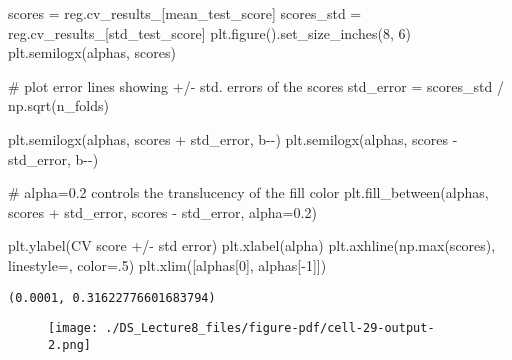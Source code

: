 \documentclass[
  letterpaper,
  DIV=11,
  numbers=noendperiod]{scrreprt}
\newenvironment{Shaded}{\begin{snugshade}}{\end{snugshade}}
\newcommand{\BuiltInTok}[1]{\textcolor[rgb]{0.00,0.23,0.31}{#1}}
\newcommand{\CommentTok}[1]{\textcolor[rgb]{0.37,0.37,0.37}{#1}}
\newcommand{\DecValTok}[1]{\textcolor[rgb]{0.68,0.00,0.00}{#1}}
\newcommand{\FloatTok}[1]{\textcolor[rgb]{0.68,0.00,0.00}{#1}}
\newcommand{\NormalTok}[1]{\textcolor[rgb]{0.00,0.23,0.31}{#1}}
\newcommand{\OperatorTok}[1]{\textcolor[rgb]{0.37,0.37,0.37}{#1}}
\newcommand{\StringTok}[1]{\textcolor[rgb]{0.13,0.47,0.30}{#1}}
\begin{document}
\begin{Shaded}
\begin{Highlighting}[]
\NormalTok{scores }\OperatorTok{=}\NormalTok{ reg.cv\_results\_[}\StringTok{\textquotesingle{}mean\_test\_score\textquotesingle{}}\NormalTok{]}
\NormalTok{scores\_std }\OperatorTok{=}\NormalTok{ reg.cv\_results\_[}\StringTok{\textquotesingle{}std\_test\_score\textquotesingle{}}\NormalTok{]}
\NormalTok{plt.figure().set\_size\_inches(}\DecValTok{8}\NormalTok{, }\DecValTok{6}\NormalTok{)}
\NormalTok{plt.semilogx(alphas, scores)}

\CommentTok{\# plot error lines showing +/{-} std. errors of the scores}
\NormalTok{std\_error }\OperatorTok{=}\NormalTok{ scores\_std }\OperatorTok{/}\NormalTok{ np.sqrt(n\_folds)}

\NormalTok{plt.semilogx(alphas, scores }\OperatorTok{+}\NormalTok{ std\_error, }\StringTok{\textquotesingle{}b{-}{-}\textquotesingle{}}\NormalTok{)}
\NormalTok{plt.semilogx(alphas, scores }\OperatorTok{{-}}\NormalTok{ std\_error, }\StringTok{\textquotesingle{}b{-}{-}\textquotesingle{}}\NormalTok{)}

\CommentTok{\# alpha=0.2 controls the translucency of the fill color}
\NormalTok{plt.fill\_between(alphas, scores }\OperatorTok{+}\NormalTok{ std\_error, scores }\OperatorTok{{-}}\NormalTok{ std\_error, alpha}\OperatorTok{=}\FloatTok{0.2}\NormalTok{)}

\NormalTok{plt.ylabel(}\StringTok{\textquotesingle{}CV score +/{-} std error\textquotesingle{}}\NormalTok{)}
\NormalTok{plt.xlabel(}\StringTok{\textquotesingle{}alpha\textquotesingle{}}\NormalTok{)}
\NormalTok{plt.axhline(np.}\BuiltInTok{max}\NormalTok{(scores), linestyle}\OperatorTok{=}\StringTok{\textquotesingle{}{-}{-}\textquotesingle{}}\NormalTok{, color}\OperatorTok{=}\StringTok{\textquotesingle{}.5\textquotesingle{}}\NormalTok{)}
\NormalTok{plt.xlim([alphas[}\DecValTok{0}\NormalTok{], alphas[}\OperatorTok{{-}}\DecValTok{1}\NormalTok{]])}
\end{Highlighting}
\end{Shaded}

\begin{verbatim}
(0.0001, 0.31622776601683794)
\end{verbatim}

\begin{figure}[H]

{\centering \texttt{[image: ./DS\_Lecture8\_files/figure-pdf/cell-29-output-2.png]}

}

\end{figure}
\end{document}
